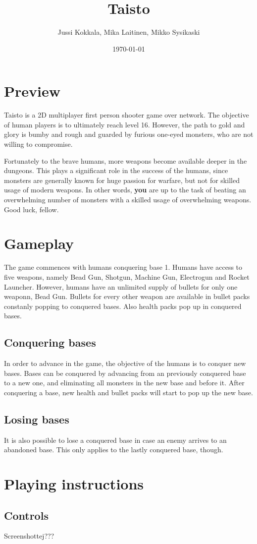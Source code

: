 \documentclass[a4paper,11pt]{article}
\title{Taisto}
\author{Jussi Kokkala, Mika Laitinen, Mikko Sysikaski}
\date{\today}
\begin{document}
\maketitle
\section*{Preview}
Taisto is a 2D multiplayer first person shooter game over network. The objective of human players is to ultimately reach level 16. However, the path to gold and glory is bumby and rough and guarded by furious one-eyed monsters, who are not willing to compromise. 

Fortunately to the brave humans, more weapons become available deeper in the dungeons. This plays a significant role in the success of the humans, since monsters are generally known for huge passion for warfare, but not for skilled usage of modern weapons. In other words, \textbf{you} are up to the task of beating an overwhelming number of monsters with a skilled usage of overwhelming weapons. Good luck, fellow.

\section*{Gameplay}
The game commences with humans conquering base 1. Humans have access to five weapons, namely Bead Gun, Shotgun, Machine Gun, Electrogun and Rocket Launcher. However, humans have an unlimited supply of bullets for only one weaponn, Bead Gun. Bullets for every other weapon are available in bullet packs constanly popping to conquered bases. Also health packs pop up in conquered bases.

\subsection*{Conquering bases}
In order to advance in the game, the objective of the humans is to conquer new bases. Bases can be conquered by advancing from an previously conquered base to a new one, and eliminating all monsters in the new base and before it. After conquering a base, new health and bullet packs will start to pop up the new base.

\subsection*{Losing bases}
It is also possible to lose a conquered base in case an enemy arrives to an abandoned base. This only applies to the lastly conquered base, though.

\section*{Playing instructions}
\subsection*{Controls}


Screenshottej???
\end{document}
